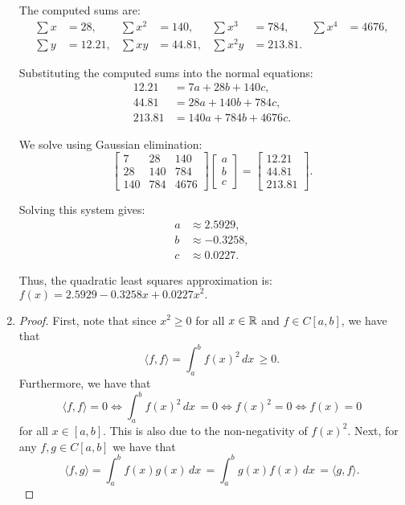\documentclass[12pt]{article}
\begin{document}
\begin{enumerate}[leftmargin=0em]
  The computed sums are:
  \begin{align}
  \sum x &= 28, & \sum x^2 &= 140, & \sum x^3 &= 784, & \sum x^4 &= 4676, \\
  \sum y &= 12.21, & \sum xy &= 44.81, & \sum x^2y &= 213.81.
  \end{align}

  Substituting the computed sums into the normal equations:
  \begin{align}
  12.21 &= 7a + 28b + 140c, \\
  44.81 &= 28a + 140b + 784c, \\
  213.81 &= 140a + 784b + 4676c.
  \end{align}

  We solve using Gaussian elimination:
  \begin{equation}
  \begin{bmatrix}
  7 & 28 & 140 \\
  28 & 140 & 784 \\
  140 & 784 & 4676
  \end{bmatrix}
  \begin{bmatrix} a \\ b \\ c \end{bmatrix} = 
  \begin{bmatrix} 12.21 \\ 44.81 \\ 213.81 \end{bmatrix}.
  \end{equation}

  Solving this system gives:
  \begin{align}
  a &\approx 2.5929, \\
  b &\approx -0.3258, \\
  c &\approx 0.0227.
  \end{align}

  Thus, the quadratic least squares approximation is:
  \(f(x) = 2.5929 - 0.3258x + 0.0227x^2.\)

  
  \item
  \begin{proof}
    First, note that since $x^2\geq 0$ for all $x\in \mathbb{R}$ and $f\in C[a,b]$, we have that
    \[\langle f,f \rangle= \int_{a}^{b}f(x)^2\, dx\, \geq 0.\]
    Furthermore, we have that
    \[\langle f, f\rangle = 0 \iff \int_{a}^{b}f(x)^2\, dx\, = 0 \iff f(x)^2 = 0 \iff f(x) = 0\]
    for all $x\in [a,b]$. This is also due to the non-negativity of $f(x)^2$. Next, for any $f,g\in C[a,b]$ we have that
    \[\langle f, g \rangle = \int_{a}^{b} f(x)g(x)\, dx\, = \int_{a}^{b} g(x)f(x)\, dx\, = \langle g, f \rangle.\]


\end{proof}
\end{enumerate}
\end{document}
